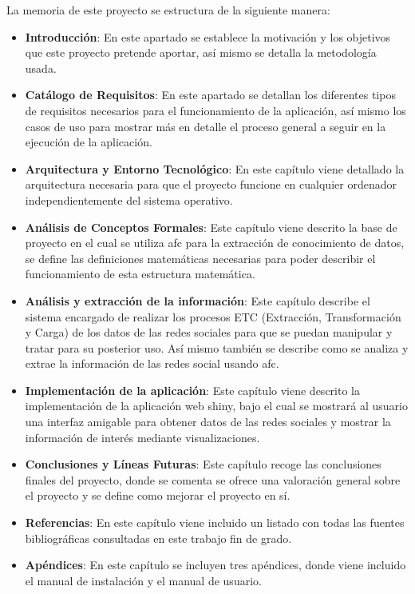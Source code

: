 \documentclass[../../main.tex]{subfiles}
\begin{document}
La memoria de este proyecto se estructura de la siguiente manera:

\begin{itemize}
    \item \textbf{Introducción}: En este apartado se establece la motivación y los objetivos que este proyecto pretende aportar, así mismo se detalla la metodología usada.
    
    \item \textbf{Catálogo de Requisitos}: En este apartado se detallan los diferentes tipos de requisitos necesarios para el funcionamiento de la aplicación, así mismo los casos de uso para mostrar más en detalle el proceso general a seguir en la ejecución de la aplicación.
    
    \item \textbf{Arquitectura y Entorno Tecnológico}: En este capítulo viene detallado la arquitectura necesaria para que el proyecto funcione en cualquier ordenador independientemente del sistema operativo.
    
    \item \textbf{Análisis de Conceptos Formales}: Este capítulo viene descrito la base de proyecto en el cual se utiliza \gls{afc} para la extracción de conocimiento de datos, se define las definiciones matemáticas necesarias para poder describir el funcionamiento de esta estructura matemática. 
    
    \item \textbf{Análisis y extracción de la información}: Este capítulo describe el sistema encargado de realizar los procesos ETC (Extracción, Transformación y Carga) de los datos de las redes sociales para que se puedan manipular y tratar para su posterior uso. Así mismo también se describe como se analiza y extrae la información de las redes social usando \gls{afc}.
    
    \item \textbf{Implementación de la aplicación}: Este capítulo viene descrito la implementación de la aplicación web \Gls{shiny}, bajo el cual se mostrará al usuario una interfaz amigable para obtener datos de las redes sociales y mostrar la información de interés mediante visualizaciones.
    
    \item \textbf{Conclusiones y Líneas Futuras}: Este capítulo recoge las conclusiones finales del proyecto, donde se comenta se ofrece una valoración general sobre el proyecto y se define como mejorar el proyecto en sí.
    
    \item \textbf{Referencias}: En este capítulo viene incluido un listado con todas las fuentes bibliográficas consultadas en este trabajo fin de grado.
    
    \item \textbf{Apéndices}: En este capítulo se incluyen tres apéndices, donde viene incluido el manual de instalación y el manual de usuario.
    
\end{itemize}
\end{document}
